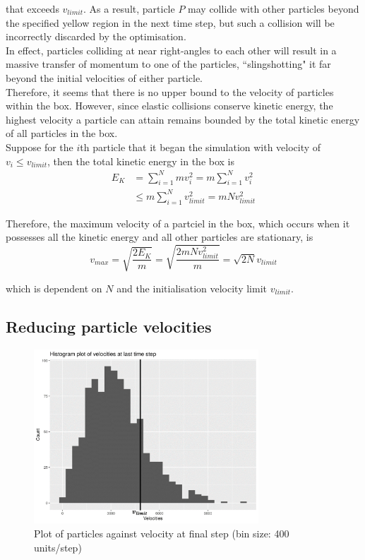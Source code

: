 \documentclass[12pt]{article}
\begin{document}
that exceeds $v_{limit}$. As a result, particle $P$ may collide with other particles beyond the specified yellow region in the next time step, but such a collision will be incorrectly discarded by the optimisation. \\

In effect, particles colliding at near right-angles to each other will result in a massive transfer of momentum to one of the particles, ``slingshotting" it far beyond the initial velocities of either particle. \\

Therefore, it seems that there is no upper bound to the velocity of particles within the box. However, since elastic collisions conserve kinetic energy, the highest velocity a particle can attain remains bounded by the total kinetic energy of all particles in the box. \\

Suppose for the $i$th particle that it began the simulation with velocity of $v_i \le v_{limit}$, then the total kinetic energy in the box is
\begin{align*}
	E_K 	&= \sum_{i=1}^N mv_i^2 = m \sum_{i=1}^N v_i^2 \\
		&\leq m \sum_{i=1}^N v_{limit}^2 = mNv_{limit}^2
\end{align*}

Therefore, the maximum velocity of a partciel in the box, which occurs when it possesses all the kinetic energy and all other particles are stationary, is
$$ v_{max} = \sqrt{\frac{2E_K}{m}} = \sqrt{\frac{2mNv_{limit}^2}{m}} = \sqrt{2N}v_{limit} $$

which is dependent on $N$ and the initialisation velocity limit $v_{limit}$.

\subsection{Reducing particle velocities}

\begin{figure}[H]
    \centering
    \includegraphics[width=0.75\textwidth]{./reportAssets/chap8Velocities}
    \caption{Plot of particles against velocity at final step (bin size: 400 units/step)}
    \label{fig:chap8Velocities}
\end{figure}
\end{document}
